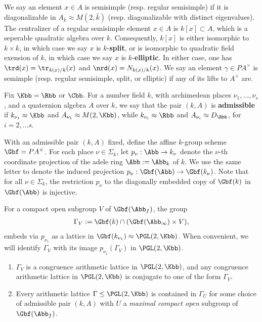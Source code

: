 \documentclass{article}
\begin{document}
We say an element $x\in A$ is semisimple (resp. regular semisimple) if it is diagonalizable in $A_{\bar{k}}\approx M(2,\bar{k})$ (resp. diagonalizable with distinct eigenvalues). The centralizer of a regular semisimple element $x\in A$ is $k[x]\subset A$, which is a seperable quadratic algebra over $k$. Consequently, $k[x]$ is either isomorphic to  $k\times k$, in which case we say  $x$ is $k$-\textbf{split},  or is isomorphic to quadratic field exension of $k$, in which case we say $x$ is $k$-\textbf{elliptic}. In either case, one has $\trd(x) = \tr_{k(x)/k}(x)$ and $\nrd(x) = N_{k(x)/k}(x)$. We say an element $\gamma \in PA^\times$ is semimple (resp. regular semisimple, split, or elliptic) if any of its lifts to $A^\times$ are.

Fix $\Kbb = \Rbb$ or $\Cbb$. For a number field $k$, with archimedean places $\nu_1,\dots,\nu_s$, and a quaternion algebra $A$ over $k$, we say that the pair $(k,A)$ is \textbf{admissible} if $k_{\nu_1} \approx \Kbb$ and $A_{\nu_1} \approx M(2,\Kbb)$, while $k_{\nu_i} \approx \Rbb$ and $A_{\nu_i}\approx D_\Rbb$, for $i=2,\dots s$.

With an admissible pair $(k,A)$ fixed, define the affine $k$-group scheme $\Gbf = PA^\times$. For each place $\nu \in \Sigma_k$, let $p_\nu : \Abb \to k_\nu$ denote the $\nu$-th coordinate projection of the adele ring $\Abb:=\Abb_k$ of $k$. We use the same letter to denote the induced projection $p_\nu: \Gbf(\Abb) \to \Gbf(k_\nu)$. Note that for all $\nu \in \Sigma_k$, the restriction $p_\nu$ to the diagonally embedded copy of $\Gbf(k)$ in $\Gbf(\Abb)$ is injective.

For a compact open subgroup $V$ of $\Gbf(\Abb_f)$, the group
\begin{align*}
    \Gamma_V := \Gbf(k) \cap (\Gbf(\Abb_\infty)\times V),
\end{align*}
embeds via $p_{\nu_1}$ as a lattice in $\Gbf(k_{\nu_1}) \approx \PGL(2,\Kbb)$. When convenient, we will identify $\Gamma_V$ with its image $p_{\nu_1}(\Gamma_V)$ in $\PGL(2,\Kbb)$.

\begin{proposition} %
    \begin{enumerate}
        \item $\Gamma_V$ is a congruence arithmetic lattice in $\PGL(2,\Kbb)$, and any congruence arithmetic lattice in $\PGL(2,\Kbb)$ is conjugate to one of the form $\Gamma_V$.
        \item Every arithmetic lattice $\Gamma \leq \PGL(2,\Kbb)$ is contained in $\Gamma_U$ for some choice of admissible pair $(k,A)$ with $U$ a \emph{maximal compact open}  subgroup of $\Gbf(\Abb_f)$.
    \end{enumerate}
\end{proposition}
\end{document}

